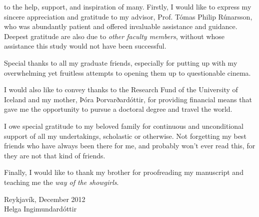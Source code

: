 
 to the help, support, and inspiration of many. Firstly, I would like to express my sincere appreciation and gratitude to my advisor, Prof. Tómas Philip Rúnarsson, who was abundantly patient and offered invaluable assistance and guidance. Deepest gratitude are also due to \emph{other faculty members}, without whose assistance this study would not have been successful.

Special thanks to all my graduate friends, especially for putting up with my overwhelming yet fruitless attempts to opening them up to questionable cinema. 

I would also like to convey thanks to the Research Fund of the University of Iceland and my mother, Þóra Þorvarðardóttir, for providing financial means that gave me the opportunity to pursue a doctoral degree and travel the world. %

I owe special gratitude to my beloved family for continuous and unconditional support of all my undertakings, scholastic or otherwise. Not forgetting my best friends who have always been there for me, and probably won't ever read this, for they are not that kind of friends. 

Finally, I would like to thank my brother for proofreading my manuscript and teaching me the \emph{way of the showgirls}.

\begin{flushright}
\vfill
Reykjavík, December 2012 \\ 
Helga Ingimundardóttir
\end{flushright}
